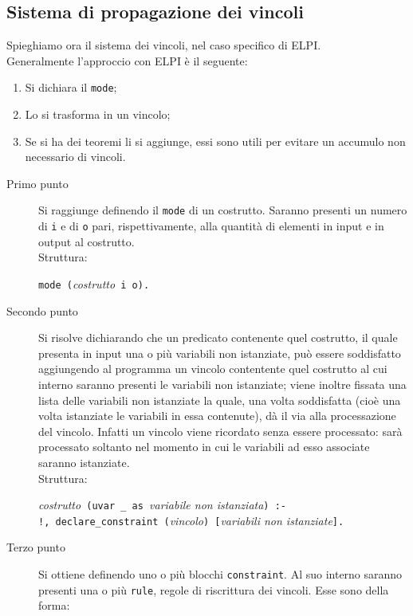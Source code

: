 \documentclass[12pt,a4paper,openright,twoside]{report}
\begin{document}
\subsection{Sistema di propagazione dei vincoli}
Spieghiamo ora il sistema dei vincoli, nel caso specifico di ELPI.\\
Generalmente l'approccio con ELPI è il seguente:
\begin{enumerate}
 \item Si dichiara il \verb"mode";
 \item Lo si trasforma in un vincolo;
 \item Se si ha dei teoremi li si aggiunge, essi sono utili per evitare un accumulo non necessario di vincoli.
\end{enumerate}
\begin{description}
 \item[Primo punto] Si raggiunge definendo il \verb"mode" di un costrutto. Saranno presenti un numero di \verb"i" e di \verb"o" pari, rispettivamente, alla quantità di elementi in input e in output al costrutto.\\
 Struttura:
 \begin{center}
 \verb"mode ("\textit{costrutto}\verb" i o)."
 \end{center}
 \item[Secondo punto] Si risolve dichiarando che un predicato contenente quel costrutto, il quale presenta in input una o più variabili non istanziate, può essere soddisfatto aggiungendo al programma un vincolo contentente quel costrutto al cui interno saranno presenti le variabili non istanziate; viene inoltre fissata una lista delle variabili non istanziate la quale, una volta soddisfatta (cioè una volta istanziate le variabili in essa contenute), dà il via alla processazione del vincolo. Infatti un vincolo viene ricordato senza essere processato: sarà processato soltanto nel momento in cui le variabili ad esso associate saranno istanziate.\\
 Struttura:
 \begin{center}
 \textit{costrutto}\verb" (uvar _ as "\textit{variabile non istanziata}\verb") :-"\\
 \verb"!, declare_constraint ("\textit{vincolo}\verb") ["\textit{variabili non istanziate}\verb"]."
 \end{center}
 \item[Terzo punto] Si ottiene definendo uno o più blocchi \verb"constraint". Al suo interno saranno presenti una o più \verb"rule", regole di riscrittura dei vincoli. Esse sono della forma:

\end{description}
\end{document}
